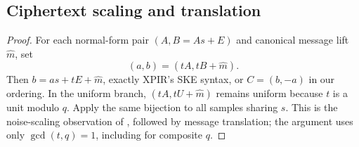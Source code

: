 \subsection{Ciphertext scaling and translation}
\label{app:ske}
\begin{proof}
For each normal-form pair \((A,B=As+E)\) and canonical message lift
\(\widehat m\), set
\[
 (a,b)=(tA,tB+\widehat m).
\]
Then \(b=as+tE+\widehat m\), exactly XPIR's SKE syntax, or
\(C=(b,-a)\) in our ordering. In the uniform branch,
\((tA,tU+\widehat m)\) remains uniform because \(t\) is a unit modulo \(q\).
Apply the same bijection to all samples sharing \(s\).
This is the noise-scaling observation of
\cite[Proposition~1]{homomorphic}, followed by message translation;
the argument uses only \(\gcd(t,q)=1\), including for composite \(q\).
\end{proof}

